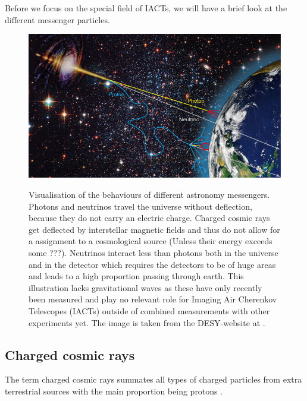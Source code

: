 Before we focus on the special field of IACTs, we will have
a brief look at the different messenger particles.

\begin{figure}
	\centering
	\includegraphics[width=.6\textwidth]{images/astro-web-titel.jpg}
	\label{fig:multi_messenger}
	\caption{Visualisation of the behaviours of different astronomy messengers.
		Photons and neutrinos 
		travel the universe without deflection, because they do not
		carry an electric charge.
		Charged cosmic rays get deflected by interstellar
		magnetic fields and thus do not allow for a assignment to a cosmological source
		(Unless their energy exceeds some ???).
		Neutrinos interact less than photons both in the universe and in the detector 
		which requires the detectors to be of huge areas and leads to a high 
		proportion passing through earth.
		This illustration lacks gravitational waves 
		as these have only recently been measured and play no relevant role 
		for Imaging Air Cherenkov Telescopes (IACTs) outside of combined 
		measurements with other experiments yet.
		The image is taken from the DESY-website at \cite{desy_mm_astro}.
	}
\end{figure}


\subsection{Charged cosmic rays}
The term charged cosmic rays summates all types of charged particles from
extra terrestrial sources with the main proportion being protons
\cite{Dembinski:2017zsh}.


